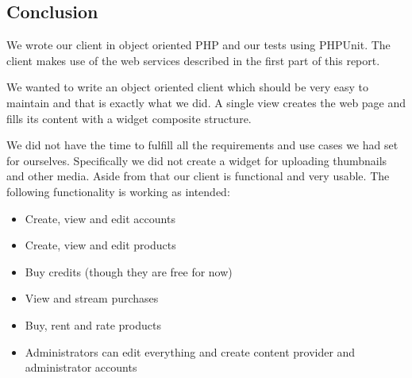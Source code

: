 \subsection{Conclusion}
We wrote our client in object oriented PHP and our tests using PHPUnit. The client makes use of the web services described in the first part of this report.

We wanted to write an object oriented client which should be very easy to maintain and that is exactly what we did. A single view creates the web page and fills its content with a widget composite structure.

We did not have the time to fulfill all the requirements and use cases we had set for ourselves. Specifically we did not create a widget for uploading thumbnails and other media. Aside from that our client is functional and very usable. The following functionality is working as intended:
\begin{itemize}
\item Create, view and edit accounts
\item Create, view and edit products
\item Buy credits (though they are free for now)
\item View and stream purchases
\item Buy, rent and rate products
\item Administrators can edit everything and create content provider and administrator accounts
\end{itemize}
\newpage